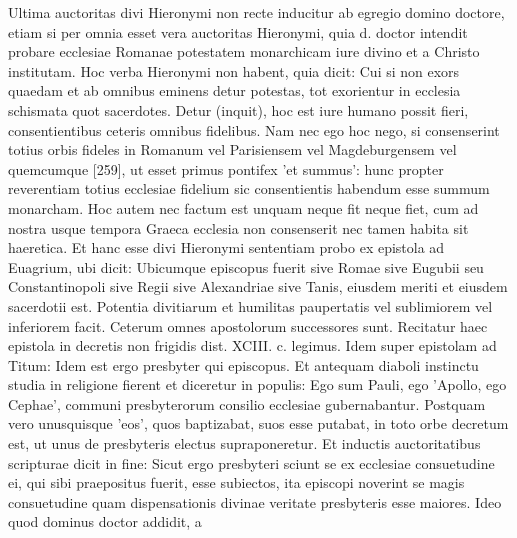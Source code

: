 Ultima auctoritas divi Hieronymi non recte inducitur ab egregio domino doctore, etiam si per omnia esset vera auctoritas Hieronymi, quia d. doctor intendit probare ecclesiae Romanae potestatem monarchicam iure divino et a Christo institutam. Hoc verba Hieronymi non habent, quia dicit: Cui si non exors quaedam et ab omnibus eminens detur potestas, tot exorientur in ecclesia schismata quot sacerdotes. Detur (inquit), hoc est iure humano possit fieri, consentientibus ceteris omnibus fidelibus. Nam nec ego hoc nego, si consenserint totius orbis fideles in Romanum vel Parisiensem vel Magdeburgensem vel quemcumque [259], ut esset primus pontifex 'et summus': hunc propter reverentiam totius ecclesiae fidelium sic consentientis habendum esse summum monarcham. Hoc autem nec factum est unquam neque fit neque fiet, cum ad nostra usque tempora Graeca ecclesia non consenserit nec tamen habita sit haeretica. Et hanc esse divi Hieronymi sententiam probo ex epistola ad Euagrium, ubi dicit: Ubicumque episcopus fuerit sive Romae sive Eugubii seu Constantinopoli sive Regii sive Alexandriae sive Tanis, eiusdem meriti et eiusdem sacerdotii est. Potentia divitiarum et humilitas paupertatis vel sublimiorem vel inferiorem facit. Ceterum omnes apostolorum successores sunt. Recitatur haec epistola in decretis non frigidis dist. XCIII. c. legimus. Idem super epistolam ad Titum: Idem est ergo presbyter qui episcopus. Et antequam diaboli instinctu studia in religione fierent et diceretur in populis: Ego sum Pauli, ego 'Apollo, ego Cephae', communi presbyterorum consilio ecclesiae gubernabantur. Postquam vero unusquisque 'eos', quos baptizabat, suos esse putabat, in toto orbe decretum est, ut unus de presbyteris electus supraponeretur. Et inductis auctoritatibus scripturae dicit in fine: Sicut ergo presbyteri sciunt se ex ecclesiae consuetudine ei, qui sibi praepositus fuerit, esse subiectos, ita episcopi noverint se magis consuetudine quam dispensationis divinae veritate presbyteris esse maiores. Ideo quod dominus doctor addidit, a 